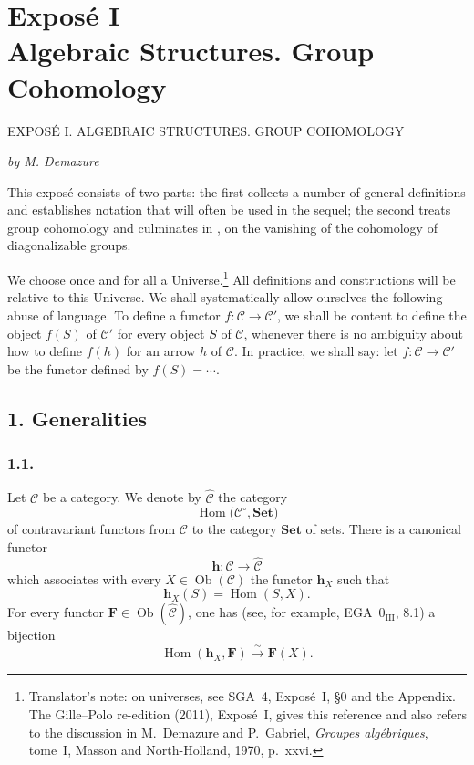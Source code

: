 
\chapter*{Expos\'e I\\Algebraic Structures. Group Cohomology}
%
  {EXPOS\'E I. ALGEBRAIC STRUCTURES. GROUP COHOMOLOGY}

\begin{center}
  \textit{by M. Demazure}
\end{center}

This expos\'e consists of two parts: the first collects a number of general
definitions and establishes notation that will often be used in the sequel;
the second treats group cohomology and culminates in , on the
vanishing of the cohomology of diagonalizable groups.

We choose once and for all a Universe.\footnote{Translator's note: on universes, see SGA~4, Exposé~I, \S0 and the
Appendix. The Gille--Polo re-edition (2011), Exposé~I, gives this reference
and also refers to the discussion in M.~Demazure and P.~Gabriel,
\textit{Groupes algébriques}, tome~I, Masson and North-Holland, 1970,
p.~xxvi.}
All definitions and constructions will be relative to this Universe. We shall
systematically allow ourselves the following abuse of language. To define a
functor \(f:\mathscr C\to\mathscr C'\), we shall be content to define the
object \(f(S)\) of \(\mathscr C'\) for every object \(S\) of \(\mathscr C\),
whenever there is no ambiguity about how to define \(f(h)\) for an arrow \(h\)
of \(\mathscr C\). In practice, we shall say: let
\(f:\mathscr C\to\mathscr C'\) be the functor defined by
\(f(S)=\cdots\).

\section*{1. Generalities}

\subsection*{1.1.}

Let \(\mathscr C\) be a category. We denote by \(\widehat{\mathscr C}\) the
category
\[
  \operatorname{Hom}\bigl(\mathscr C^{\circ},\mathbf{Set}\bigr)
\]
of contravariant functors from \(\mathscr C\) to the category \(\mathbf{Set}\)
of sets. There is a canonical functor
\[
  \mathbf h:\mathscr C\longrightarrow\widehat{\mathscr C}
\]
which associates with every \(X\in\operatorname{Ob}(\mathscr C)\) the functor
\(\mathbf h_X\) such that
\[
  \mathbf h_X(S)=\operatorname{Hom}(S,X).
\]
For every functor \(\mathbf F\in\operatorname{Ob}(\widehat{\mathscr C})\),
one has (see, for example, EGA~\(0_{\mathrm{III}}\), 8.1) a bijection
\[
  \operatorname{Hom}(\mathbf h_X,\mathbf F)
    \xrightarrow{\ \sim\ } \mathbf F(X).
\]

